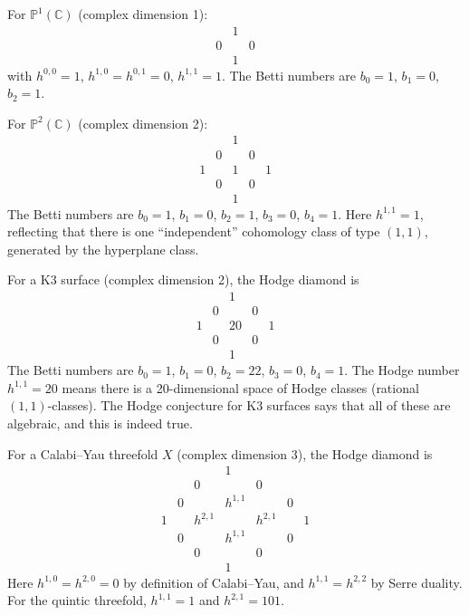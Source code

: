 \begin{example}
For $\mathbb{P}^1(\mathbb{C})$ (complex dimension 1):
\[
\begin{array}{ccc}
 & 1 & \\
0 & & 0 \\
 & 1 &
\end{array}
\]
with $h^{0,0} = 1$, $h^{1,0} = h^{0,1} = 0$, $h^{1,1} = 1$. The Betti numbers are $b_0 = 1$, $b_1 = 0$, $b_2 = 1$.
\end{example}

\begin{example}
For $\mathbb{P}^2(\mathbb{C})$ (complex dimension 2):
\[
\begin{array}{ccccc}
 & & 1 & & \\
 & 0 & & 0 & \\
1 & & 1 & & 1 \\
 & 0 & & 0 & \\
 & & 1 & &
\end{array}
\]
The Betti numbers are $b_0 = 1$, $b_1 = 0$, $b_2 = 1$, $b_3 = 0$, $b_4 = 1$. Here $h^{1,1} = 1$, reflecting that there is one ``independent'' cohomology class of type $(1,1)$, generated by the hyperplane class.
\end{example}

\begin{example}
For a K3 surface (complex dimension 2), the Hodge diamond is
\[
\begin{array}{ccccc}
 & & 1 & & \\
 & 0 & & 0 & \\
1 & & 20 & & 1 \\
 & 0 & & 0 & \\
 & & 1 & &
\end{array}
\]
The Betti numbers are $b_0 = 1$, $b_1 = 0$, $b_2 = 22$, $b_3 = 0$, $b_4 = 1$. The Hodge number $h^{1,1} = 20$ means there is a 20-dimensional space of Hodge classes (rational $(1,1)$-classes). The Hodge conjecture for K3 surfaces says that all of these are algebraic, and this is indeed true.
\end{example}

\begin{example}
For a Calabi--Yau threefold $X$ (complex dimension 3), the Hodge diamond is
\[
\begin{array}{ccccccc}
 & & & 1 & & & \\
 & & 0 & & 0 & & \\
 & 0 & & h^{1,1} & & 0 & \\
1 & & h^{2,1} & & h^{2,1} & & 1 \\
 & 0 & & h^{1,1} & & 0 & \\
 & & 0 & & 0 & & \\
 & & & 1 & & &
\end{array}
\]
Here $h^{1,0} = h^{2,0} = 0$ by definition of Calabi--Yau, and $h^{1,1} = h^{2,2}$ by Serre duality. For the quintic threefold, $h^{1,1} = 1$ and $h^{2,1} = 101$.
\end{example}

